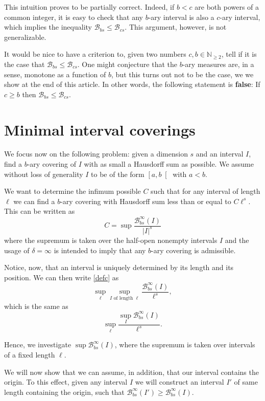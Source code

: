 \documentclass[11pt, reqno]{amsart}
\newcommand{\N}{\mathbb{N}}
\newcommand{\BB}{\mathcal{B}}
\begin{document}
This intuition proves to be partially correct. Indeed, if $b < c$ are both powers of a common integer, it is easy to check that any $b$-ary interval is also a $c$-ary interval, which implies the inequality $\BB_{bs} \leq \BB_{cs}$. This argument, however, is not generalizable.

It would be nice to have a criterion to, given two numbers $c, b \in \N_{\geq 2}$, tell if it is the case that $\BB_{bs} \leq \BB_{cs}$. One might conjecture that the $b$-ary measures are, in a sense, monotone as a function of $b$, but this turns out not to be the case, we we show at the end of this article. In other words, the following statement is \textbf{false}: If $c \geq b$ then $\BB_{bs} \leq \BB_{cs}$.

\section{Minimal interval coverings}\label{sec5}

We focus now on the following problem: given a dimension $s$ and an interval $I$, find a $b$-ary covering of $I$ with as small a Hausdorff sum as possible. We assume without loss of generality $I$ to be of the form $\left[ a, b \right[$ with $a < b$.

We want to determine the infimum possible $C$ such that for any interval of length $\ell$ we can find a $b$-ary covering with Hausdorff sum less than or equal to $C \ell^s$. This can be written as
\begin{equation}\label{defc}
C = \sup \frac{\BB_{bs}^\infty(I)}{\lvert I \rvert^s}
\end{equation}
where the supremum is taken over the half-open nonempty intervals $I$ and the usage of $\delta = \infty$ is intended to imply that any $b$-ary covering is admissible.

Notice, now, that an interval is uniquely determined by its length and its position. We can then write \eqref{defc} as
\[\sup_\ell \sup_\text{$I$ of length $\ell$} \frac{\BB_{bs}^\infty(I)}{\ell^s},\]
which is the same as
\[\sup_\ell \frac{\sup_I \BB_{bs}^\infty(I)}{\ell^s}.\]

Hence, we investigate $\sup \BB_{bs}^\infty(I)$, where the supremum is taken over intervals of a fixed length $\ell$.

We will now show that we can assume, in addition, that our interval contains the origin. To this effect, given any interval $I$ we will construct an interval $I'$ of same length containing the origin, such that $\BB_{bs}^\infty(I') \geq \BB_{bs}^\infty(I)$.
\end{document}
